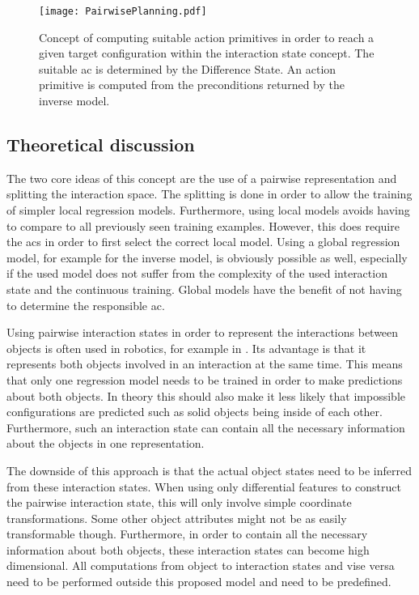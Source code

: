 \begin{figure}
	\centering
	\texttt{[image: PairwisePlanning.pdf]}
	\caption{Concept of computing suitable action primitives in order to reach a given target configuration within the interaction state concept. The suitable \gls{ac} is determined by the Difference State. An action primitive is computed from the preconditions returned by the inverse model.} 
	\label{fig:PairPlanning}
\end{figure}


\subsection{Theoretical discussion \label{sec:interactionTheory}}
The two core ideas of this concept are the use of a pairwise representation and splitting the interaction space. The splitting is done in order to allow the training of simpler local regression models. Furthermore, using local models avoids having to compare to all previously seen training examples. However, this does require the \acrlong{acs} in order to first select the correct local model.
Using a global regression model, for example for the inverse model, is obviously possible as well, especially if the used model does not suffer from the complexity of the used interaction state and the continuous training. Global models have the benefit of not having to determine the responsible \acrlong{ac}.

Using pairwise interaction states in order to represent the interactions between objects is often used in robotics, for example in \cite{moldovan2012learning,pairwise2}. 
Its advantage is that it represents both objects involved in an interaction at the same time. This means that only one regression model needs to be trained in order to make predictions about both objects. In theory this should also make it less likely that impossible configurations are predicted such as solid objects being inside of each other. Furthermore, such an interaction state can contain all the necessary information about the objects in one representation. 

The downside of this approach is that the actual object states need to be inferred from these interaction states. When using only differential features to construct the pairwise interaction state, this will only involve simple coordinate transformations. Some other object attributes might not be as easily transformable though. Furthermore, in order to contain all the necessary information about both objects, these interaction states can become high dimensional. All computations from object to interaction states and vise versa need to be performed outside this proposed model and need to be predefined.

